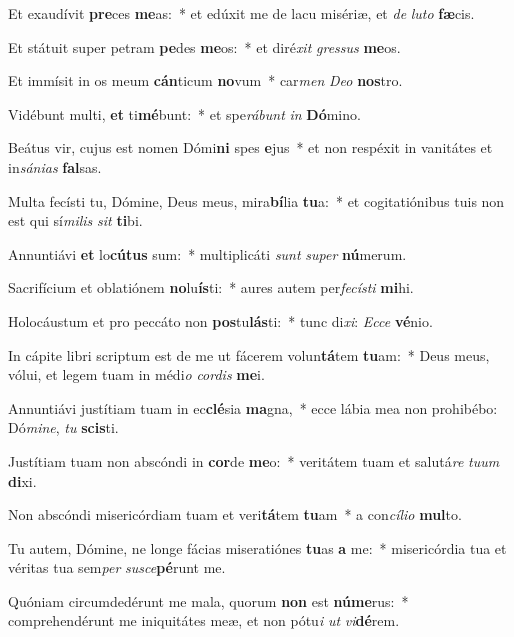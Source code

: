 \item Et exaudívit \textbf{pre}ces \textbf{me}as:~* et edúxit me de lacu misériæ, et \textit{de} \textit{lu}\textit{to} \textbf{fæ}cis.
\item Et státuit super petram \textbf{pe}des \textbf{me}os:~* et diré\textit{xit} \textit{gres}\textit{sus} \textbf{me}os.
\item Et immísit in os meum \textbf{cán}ticum \textbf{no}vum~* car\textit{men} \textit{De}\textit{o} \textbf{nos}tro.
\item Vidébunt multi, \textbf{et} ti\textbf{mé}bunt:~* et spe\textit{rá}\textit{bunt} \textit{in} \textbf{Dó}mino.
\item Beátus vir, cujus est nomen Dómi\textbf{ni} spes \textbf{e}jus~* et non respéxit in vanitátes et in\textit{sá}\textit{ni}\textit{as} \textbf{fal}sas.
\item Multa fecísti tu, Dómine, Deus meus, mira\textbf{bí}lia \textbf{tu}a:~* et cogitatiónibus tuis non est qui sí\textit{mi}\textit{lis} \textit{sit} \textbf{ti}bi.
\item Annuntiávi \textbf{et} lo\textbf{cú}\textbf{tus} sum:~* multiplicáti \textit{sunt} \textit{su}\textit{per} \textbf{nú}merum.
\item Sacrifícium et oblatiónem \textbf{no}lu\textbf{ís}ti:~* aures autem per\textit{fe}\textit{cís}\textit{ti} \textbf{mi}hi.
\item Holocáustum et pro peccáto non \textbf{pos}tu\textbf{lás}ti:~* tunc di\textit{xi}: \textit{Ec}\textit{ce} \textbf{vé}nio.
\item In cápite libri scriptum est de me ut fácerem volun\textbf{tá}tem \textbf{tu}am:~* Deus meus, vólui, et legem tuam in médi\textit{o} \textit{cor}\textit{dis} \textbf{me}i.
\item Annuntiávi justítiam tuam in ec\textbf{clé}sia \textbf{ma}gna,~* ecce lábia mea non prohibébo: Dó\textit{mi}\textit{ne}, \textit{tu} \textbf{scis}ti.
\item Justítiam tuam non abscóndi in \textbf{cor}de \textbf{me}o:~* veritátem tuam et salutá\textit{re} \textit{tu}\textit{um} \textbf{di}xi.
\item Non abscóndi misericórdiam tuam et veri\textbf{tá}tem \textbf{tu}am~* a con\textit{cí}\textit{li}\textit{o} \textbf{mul}to.
\item Tu autem, Dómine, ne longe fácias miseratiónes \textbf{tu}as \textbf{a} me:~* misericórdia tua et véritas tua sem\textit{per} \textit{su}\textit{sce}\textbf{pé}runt me.
\item Quóniam circumdedérunt me mala, quorum \textbf{non} est \textbf{nú}\textbf{me}rus:~* comprehendérunt me iniquitátes meæ, et non pótu\textit{i} \textit{ut} \textit{vi}\textbf{dé}rem.
